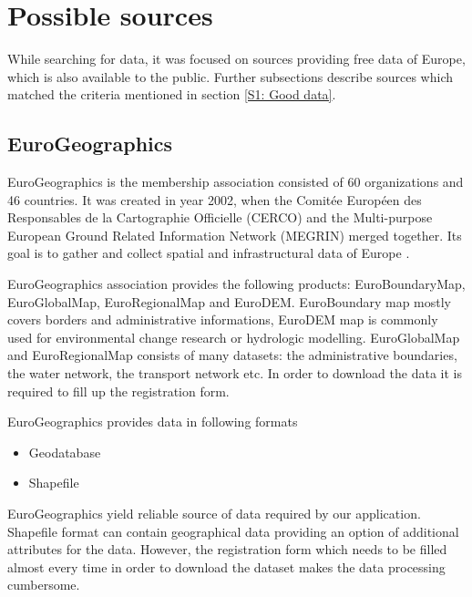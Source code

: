 \documentclass[thesis=M,english]{FITthesis}[2012/10/20]
\begin{document}
\section{Possible sources}

While searching for data, it was focused on sources providing free data of Europe, which is also available to the public. Further subsections describe sources which matched the criteria mentioned in section \ref{S1: Good data}.

 
\subsection{EuroGeographics}
EuroGeographics is the membership association consisted of 60 organizations and 46 countries. It was created in year 2002, when the Comit{\' e}e Europ{\' e}en des Responsables de la Cartographie Officielle (CERCO) and the Multi-purpose European Ground Related Information Network (MEGRIN) merged together. Its goal is to gather and collect spatial and infrastructural data of Europe \cite{Euro16}. 

EuroGeographics association provides the following products: EuroBoundaryMap, EuroGlobalMap, EuroRegionalMap and EuroDEM.
EuroBoundary map mostly covers borders and administrative informations, EuroDEM map is commonly used for environmental change research or hydrologic modelling.
EuroGlobalMap and EuroRegionalMap consists of many datasets: the administrative boundaries, the water network, the transport network etc. 
In order to download the data it is required to fill up the registration form.

EuroGeographics provides data in following formats

\begin{itemize}
\item Geodatabase
\item Shapefile
\end{itemize}

EuroGeographics yield reliable source of data required by our application. Shapefile format can contain geographical data providing an option of additional attributes for the data. However, the registration form which needs to be filled almost every time in order to download the dataset makes the data processing cumbersome.
\end{document}

